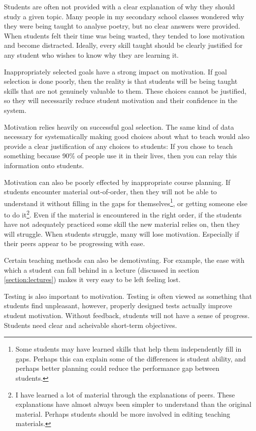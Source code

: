       Students are often not provided with a clear explanation of why they should study a given topic. Many people in my secondary school classes wondered why they were being taught to analyse poetry, but no clear answers were provided. When students felt their time was being wasted, they tended to lose motivation and become distracted. Ideally, every skill taught should be clearly justified for any student who wishes to know why they are learning it.

      Inappropriately selected goals have a strong impact on motivation. If goal selection is done poorly, then the reality is that students will be being taught skills that are not genuinely valuable to them. These choices cannot be justified, so they will necessarily reduce student motivation and their confidence in the system.

      Motivation relies heavily on successful goal selection. The same kind of data necessary for systematically making good choices about what to teach would also provide a clear justification of any choices to students: If you chose to teach something because 90\% of people use it in their lives, then you can relay this information onto students.

      Motivation can also be poorly effected by inappropriate course planning. If students encounter material out-of-order, then they will not be able to understand it without filling in the gaps for themselves\footnote{Some students may have learned skills that help them independently fill in gaps. Perhaps this can explain some of the differences is student ability, and perhaps better planning could reduce the performance gap between students.}, or getting someone else to do it\footnote{I have learned a lot of material through the explanations of peers. These explanations have almost always been simpler to understand than the original material. Perhaps students should be more involved in editing teaching materials.}. Even if the material is encountered in the right order, if the students have not adequately practiced some skill the new material relies on, then they will struggle. When students struggle, many will lose motivation. Especially if their peers appear to be progressing with ease.

      Certain teaching methods can also be demotivating. For example, the ease with which a student can fall behind in a lecture (discussed in section \ref{section:lectures}) makes it very easy to be left feeling lost.

      Testing is also important to motivation. Testing is often viewed as something that students find unpleasant, however, properly designed tests actually improve student motivation. Without feedback, students will not have a sense of progress. Students need clear and acheivable short-term objectives.\cite{tgat_14}

